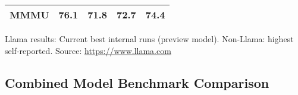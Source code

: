 \documentclass{scrartcl}
\begin{document}
\begin{table}[H]
\begin{threeparttable}
\begin{tabularx}{\textwidth}{@{} L T{2.1} T{2.1} T{2.1} T{2.1} @{}}
            MMMU                          & \bfseries 76.1              & 71.8                         & 72.7                      & 74.4               \\
            \bottomrule
        \end{tabularx}
        \begin{tablenotes}
            \footnotesize
            \item Llama results: Current best internal runs (preview model). Non-Llama: highest self-reported. Source: \url{https://www.llama.com}
        \end{tablenotes}
    \end{threeparttable}
\end{table}

\subsection*{Combined Model Benchmark Comparison}
\end{document}
